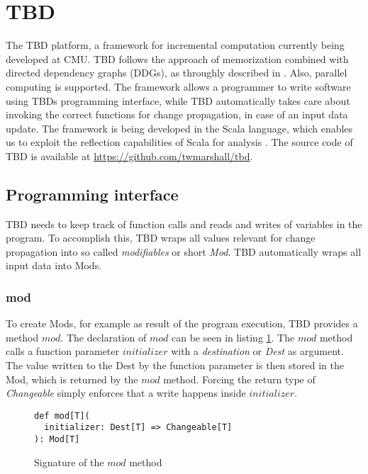 \section{TBD}
\label{sec:tbd}
The TBD platform, a framework for incremental computation currently being developed at CMU. TBD follows the approach of memorization combined with directed dependency graphs (DDGs), as throughly described in \cite{Acar2005thesis}. Also, parallel computing is supported. The framework allows a programmer to write software using TBDs programming interface, while TBD automatically takes care about invoking the correct functions for change propagation, in case of an input data update. \cite{?}
The framework is being developed in the Scala language, which enables us to exploit the reflection capabilities of Scala for analysis \cite{burmako2013scala} \cite{stocker2010scala}. 
The source code of TBD is available at \hyperref[]{https://github.com/twmarshall/tbd}. 

\subsection{Programming interface}
TBD needs to keep track of function calls and reads and writes of variables in the program. To accomplish this, TBD wraps all values relevant for change propagation into so called \textit{modifiables} or short \textit{Mod}. TBD automatically wraps all input data into Mods. 

\subsubsection{mod}
To create Mods, for example as result of the program execution, TBD provides a method $mod$. The declaration of $mod$ can be seen in listing \ref{code:mod}. The $mod$ method calls a function parameter $initializer$ with a \textit{destination} or \textit{Dest} as argument. The value written to the Dest by the function parameter is then stored in the Mod, which is returned by the $mod$ method. Forcing the return type of \textit{Changeable} simply enforces that a write happens inside $initializer$. 

\begin{figure}
\begin{lstlisting}[frame=single,basicstyle=\ttfamily]
def mod[T](
  initializer: Dest[T] => Changeable[T]
): Mod[T]
\end{lstlisting}
\caption{Signature of the $mod$ method}
\label{code:mod}
\end{figure}

